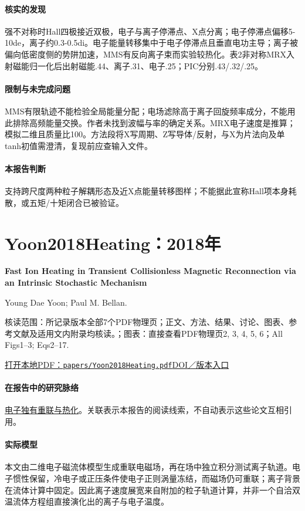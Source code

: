 \paragraph{核实的发现}强不对称时Hall四极接近双极，电子与离子停滞点、X点分离；电子停滞点偏移5-10de，离子约0.3-0.5di。电子能量转移集中于电子停滞点且垂直电功主导；离子被偏向低密度侧的势阱加速，MMS有反向离子束而实验较热化。表2非对称MRX入射磁能归一化后出射磁能.44、离子.31、电子.25；PIC分别.43/.32/.25。

\paragraph{限制与未完成问题}MMS有限轨迹不能检验全局能量分配；电场滤除高于离子回旋频率成分，不能用此排除高频能量交换。作者未找到波幅与率的确定关系。MRX电子速度是推算；模拟二维且质量比100。方法段将X写周期、Z写导体/反射，与X为片法向及单tanh初值需澄清，复现前应查输入文件。

\paragraph{本报告判断}支持跨尺度两种粒子解耦形态及近X点能量转移图样；不能据此宣称Hall项本身耗散，或五矩/十矩闭合已被验证。

\section{Yoon2018Heating：2018年}\label{paper:Yoon2018Heating}

\textbf{Fast Ion Heating in Transient Collisionless Magnetic Reconnection via an Intrinsic Stochastic Mechanism}\citep{Yoon2018Heating}\

Young Dae Yoon;  Paul M. Bellan.

\textsf{核读范围：}所记录版本全部7个PDF物理页；正文、方法、结果、讨论、图表、参考文献及适用文内附录均核读。；\textsf{图表：}直接查看PDF物理页2, 3, 4, 5, 6；All Figs1–3;  Eqs2–17.

\href{run:papers/Yoon2018Heating.pdf}{打开本地PDF：\texttt{papers/Yoon2018Heating.pdf}}\quad\href{https://doi.org/10.3847/2041-8213/aaf0a3}{DOI／版本入口}

\paragraph{在报告中的研究脉络}\hyperref[story:energy]{电子独有重联与热化}。关联表示本报告的阅读线索，不自动表示这些论文互相引用。

\paragraph{实际模型}本文由二维电子磁流体模型生成重联电磁场，再在场中独立积分测试离子轨道。电子惯性保留，冷电子或正压条件使电子正则涡量冻结，而磁场仍可重联；离子背景在流体计算中固定。因此离子速度展宽来自附加的粒子轨道计算，并非一个自洽双温流体方程组直接演化出的离子与电子温度。


